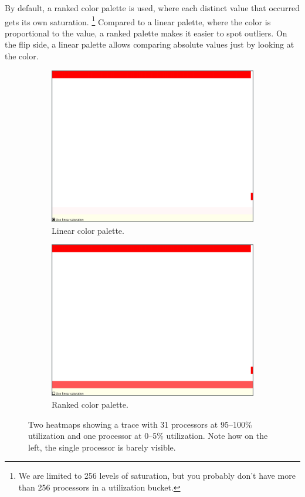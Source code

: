 \documentclass[10pt,letterpaper,oneside,openany,english]{memoir}
\begin{document}
By default, a ranked color palette is used, where each distinct value that occurred gets its own saturation.%
\footnote{We are limited to 256 levels of saturation, but you probably don't have more than 256 processors in a utilization bucket.}
Compared to a linear palette, where the color is proportional to the value, a ranked palette makes it easier to spot outliers.
On the flip side, a linear palette allows comparing absolute values just by looking at the color.

\begin{figure}[h]
  \centering
  \begin{subfigure}[b]{0.49\textwidth}
    \centering
    \includegraphics[width=\textwidth]{images/screenshots/heatmap-linear.png}
    \caption{Linear color palette.}
  \end{subfigure}
  \hfill
  \begin{subfigure}[b]{0.49\textwidth}
    \centering
    \includegraphics[width=\textwidth]{images/screenshots/heatmap-ranked.png}
    \caption{Ranked color palette.}
  \end{subfigure}

  \caption{Two heatmaps showing a trace with 31 processors at 95--100\% utilization and one processor at 0--5\% utilization. Note how on the left, the single processor is barely visible.}
\end{figure}
\end{document}
